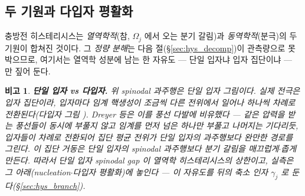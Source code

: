 \documentclass[11pt,a4paper]{article}
\newtheorem*{flagbox}{비고}
\begin{document}
\subsection{두 기원과 다입자 평활화}
충방전 히스테리시스는 \emph{열역학적}(참, $\Omega_j$ 에서 오는 분기 갈림)과 \emph{동역학적}(분극)의 두 기원이
합쳐진 것이다. 그 \emph{정량 분해}는 다음 절(\S\ref{sec:hys_decomp})이 관측량으로 못 박으므로, 여기서는 열역학
성분에 남는 한 자유도 — 단일 입자냐 입자 집단이냐 — 만 짚어 둔다.
\begin{flagbox}
\textbf{단일 입자 vs 다입자.} 위 spinodal 과주행은 \emph{단일 입자} 그림이다. 실제 전극은 입자 집단이라, 입자마다
임계 핵생성이 조금씩 다른 전위에서 일어나 \emph{하나씩 차례로} 전환된다(다입자 그림 \cite{dreyer2010}).
Dreyer 등은 이를 \emph{풍선 다발}에 비유했다 — 같은 압력을 받는 풍선들이 동시에 부풀지 않고 임계를 먼저 넘은
하나만 부풀고 나머지는 기다리듯, 입자들이 차례로 전환되어 집단 평균 전위가 단일 입자의 과주행보다 완만한 경로를
그린다. 이
집단 거동은 단일 입자의 spinodal 과주행보다 분기 갈림을 \emph{매끄럽게$\cdot$좁게} 만든다. 따라서 단일 입자
spinodal gap 이 열역학 히스테리시스의 \emph{상한}이고, 실측은 그 아래(nucleation$\cdot$다입자 평활화)에 놓인다 —
이 자유도를 뒤의 축소 인자 $\gamma_j$ 로 둔다(\S\ref{sec:hys_branch}).
\end{flagbox}

\end{document}
